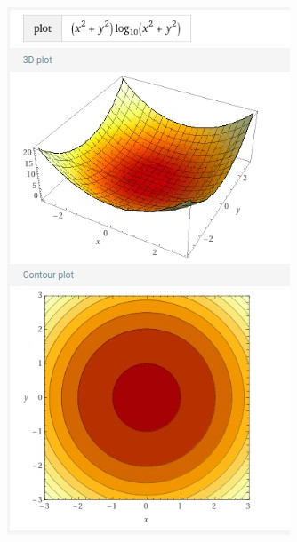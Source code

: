 \documentclass[conference]{IEEEtran}
\begin{document}
\begin{figure}[!htbp]
\centering
{}
  \includegraphics[width=\linewidth]{media/RBF_log.jpg}
\endminipage
{}

\end{figure}
\end{document}
